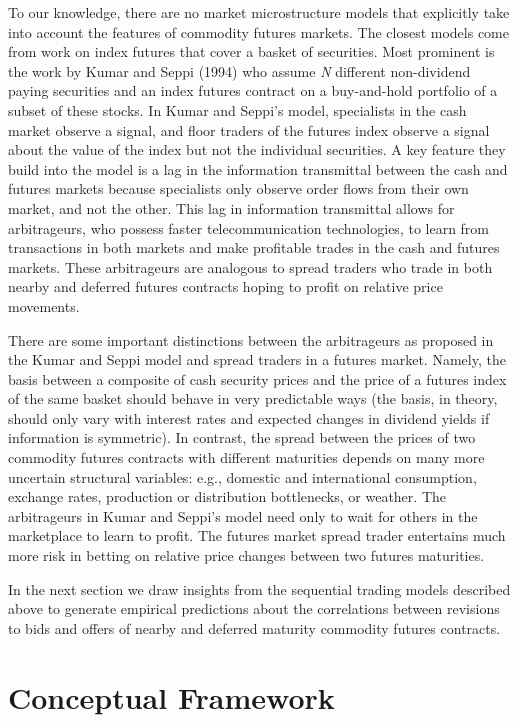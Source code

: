 \documentclass[review,12pt]{elsarticle}
\begin{document}
\begin{linenumbers}
To our knowledge, there are no market microstructure models that
explicitly take into account the features of commodity futures markets.
The closest models come from work on index futures that cover a basket
of securities. Most prominent is the work by Kumar and Seppi (1994) who
assume \emph{N} different non-dividend paying securities and an index
futures contract on a buy-and-hold portfolio of a subset of these
stocks. In Kumar and Seppi's model, specialists in the cash market
observe a signal, and floor traders of the futures index observe a
signal about the value of the index but not the individual securities. A
key feature they build into the model is a lag in the information
transmittal between the cash and futures markets because specialists
only observe order flows from their own market, and not the other. This
lag in information transmittal allows for arbitrageurs, who possess
faster telecommunication technologies, to learn from transactions in
both markets and make profitable trades in the cash and futures markets.
These arbitrageurs are analogous to spread traders who trade in both
nearby and deferred futures contracts hoping to profit on relative price
movements.

There are some important distinctions between the arbitrageurs as
proposed in the Kumar and Seppi model and spread traders in a futures
market. Namely, the basis between a composite of cash security prices
and the price of a futures index of the same basket should behave in
very predictable ways (the basis, in theory, should only vary with
interest rates and expected changes in dividend yields if information is
symmetric). In contrast, the spread between the prices of two commodity
futures contracts with different maturities depends on many more
uncertain structural variables: e.g., domestic and international
consumption, exchange rates, production or distribution bottlenecks, or
weather. The arbitrageurs in Kumar and Seppi's model need only to wait
for others in the marketplace to learn to profit. The futures market
spread trader entertains much more risk in betting on relative price
changes between two futures maturities.

In the next section we draw insights from the sequential trading models
described above to generate empirical predictions about the correlations
between revisions to bids and offers of nearby and deferred maturity
commodity futures contracts.

\section{Conceptual Framework}\label{conceptual-framework}


\end{linenumbers}
\end{document}
